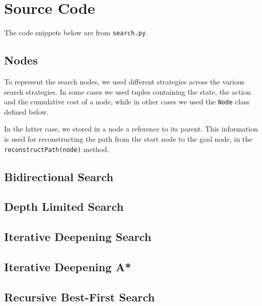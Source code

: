 \chapter{Source Code} 

The code snippets below are from \verb|search.py|.



\section{Nodes}

To represent the search nodes, we used different strategies across the various search strategies. In some cases we used tuples containing the state, the action and the cumulative cost of a node, while in other cases we used the \verb|Node| class defined below.

In the latter case, we stored in a node a reference to its parent. This information is used for reconstructing the path from the start node to the goal node, in the \verb|reconstructPath(node)| method.




  
  
  
\section{Bidirectional Search}





\section{Depth Limited Search}





\section{Iterative Deepening Search}





\section{Iterative Deepening A*}





\section{Recursive Best-First Search}



